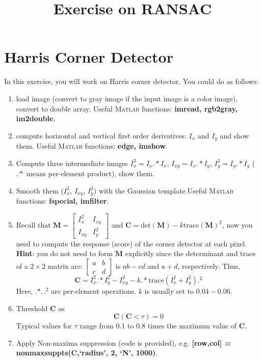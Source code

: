 \documentclass[a4paper]{article}
\begin{document}
\title{Exercise on RANSAC}
\maketitle%

\section{Harris Corner Detector}

In this exercise, you will work on Harris corner detector. You could do as follows:
\begin{enumerate}
\item load image (convert to gray image if the input image is a color image), convert to double array. Useful \textsc{Matlab} functions: \textbf{imread, rgb2gray, im2double}. 
\item compute horizontal and vertical first order derivatives: $I_x$ and $I_y$ and show them. Useful \textsc{Matlab} functions: \textbf{edge, imshow}. 
\item Compute three intermediate images $I_x^2=I_x.*I_x$, $I_{xy}=I_x.*I_y$, $I_y^2=I_y.*I_y$ ($.*$ means per-element product), show them.
\item Smooth them ($I_x^2$, $I_{xy}$, $I_y^2$) with the Gaussian template.Useful \textsc{Matlab} functions: \textbf{fspecial, imfilter}.  
\item Recall that $\mathbf{M}=\left[\begin{matrix}
I_x^2 & I_{xy} \\ I_{xy} & I_y^2
\end{matrix}\right]$ and $\mathbf{C}=\text{det}(\mathbf{M})-k\text{trace}(\mathbf{M})^2$, now you need to compute the response (score) of the corner detector at each pixel. \textbf{Hint}: you do not need to form $\mathbf{M}$ explicitly since the determinant and trace of a $2\times 2$ matrix are:
$\left[\begin{matrix}
a & b \\ c & d 
\end{matrix}\right]$ is $ab-cd$ and $a+d$, respectively. Thus, $$\mathbf{C}=I_x^2.*I_y^2-I_{xy}^2-k.*\text{trace}(I_x^2+I_y^2).^2$$
Here, $.*, .^2$ are per-element operations. $k$ is usually set to $0.04-0.06$.
\item Threshold $\mathbf{C}$ as
$$
\mathbf{C}(\mathbf{C}<\tau)=0
$$
Typical values for $\tau$ range from 0.1 to 0.8 times the maximum value of $\mathbf{C}$.
\item Apply Non-maxima suppression (code is provided), e.g. \textbf{[row,col] = nonmaxsuppts(C,`radius', 2, `N', 1000)}.
\end{enumerate}
\end{document}
